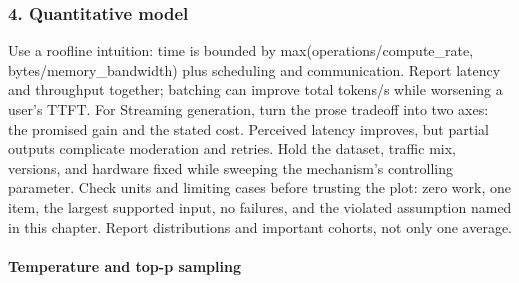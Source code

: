 \subsubsection*{4. Quantitative model}
Use a roofline intuition: time is bounded by max(operations/compute\_rate, bytes/memory\_bandwidth) plus scheduling and communication. Report latency and throughput together; batching can improve total tokens/s while worsening a user's TTFT.
For Streaming generation, turn the prose tradeoff into two axes: the promised gain and the stated cost. Perceived latency improves, but partial outputs complicate moderation and retries. Hold the dataset, traffic mix, versions, and hardware fixed while sweeping the mechanism's controlling parameter.
Check units and limiting cases before trusting the plot: zero work, one item, the largest supported input, no failures, and the violated assumption named in this chapter. Report distributions and important cohorts, not only one average.
\paragraph{Temperature and top-p sampling}
